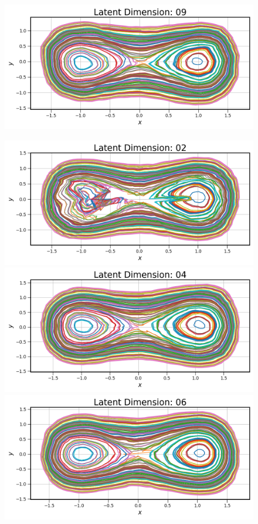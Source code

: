 \begin{figure}[!htbp]
\begin{minipage}{.5\textwidth}
        \includegraphics[width=\textwidth]{"../Figures/duffing_trajectories_09.png"} 
    \end{minipage}%
    \begin{minipage}{.5\textwidth}
        \includegraphics[width=\textwidth]{"../Figures/duffing_trajectories_02.png"} 
        \includegraphics[width=\textwidth]{"../Figures/duffing_trajectories_04.png"} 
        \includegraphics[width=\textwidth]{"../Figures/duffing_trajectories_06.png"} 

\end{minipage}
\end{figure}
